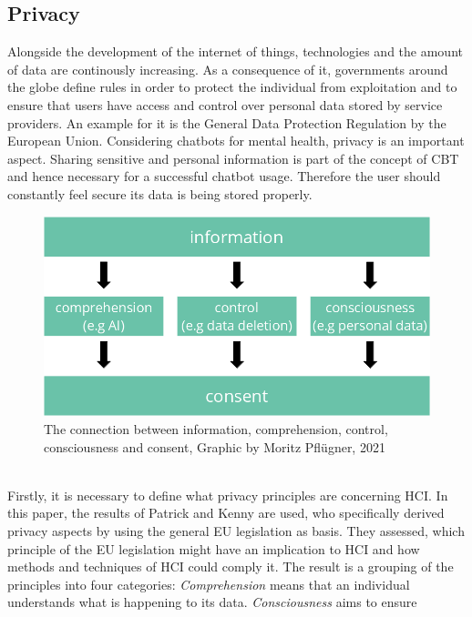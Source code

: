 \documentclass[sigconf, nonacm]{acmart}
\begin{document}
\subsection{Privacy}
Alongside the development of the internet of things, technologies and the amount of data are continously increasing\cite{Reinsel2018}.
As a consequence of it, governments around the globe define rules in order to protect the individual from exploitation and to ensure that users have access and control over personal data stored by service providers.
An example for it is the General Data Protection Regulation by the European Union. Considering chatbots for mental health, privacy is an important aspect. Sharing sensitive and personal information is part of the concept of CBT and hence necessary for a successful chatbot usage. Therefore the user should constantly feel secure its data is being stored properly. 
\begin{figure}[h]
  \centering
  \includegraphics[width=\linewidth]{privacy_base}
  \caption{The connection between information, comprehension, control, consciousness and consent, Graphic by Moritz Pflügner, 2021}
  \label{fig:privacy_base}
\end{figure}
\\
Firstly, it is necessary to define what privacy principles are concerning HCI. In this paper, the results of Patrick and Kenny \cite{Patrick2003} are used, who specifically derived privacy aspects by using the general EU legislation as basis.
They assessed, which principle of the EU legislation might have an implication to HCI and how methods and techniques of HCI could comply it. The result is a grouping of the principles into four categories: \emph{Comprehension} means that an individual understands what is happening to its data. \emph{Consciousness} aims to ensure
\end{document}
